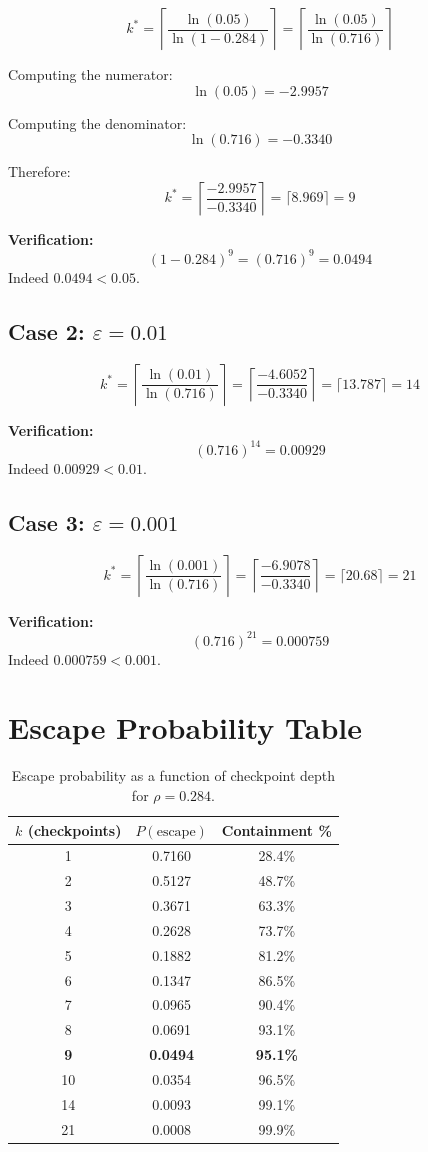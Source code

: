 \documentclass[12pt,a4paper]{article}
\begin{document}
\[
k^* = \left\lceil \frac{\ln(0.05)}{\ln(1 - 0.284)} \right\rceil = \left\lceil \frac{\ln(0.05)}{\ln(0.716)} \right\rceil
\]

Computing the numerator:
\[
\ln(0.05) = -2.9957
\]

Computing the denominator:
\[
\ln(0.716) = -0.3340
\]

Therefore:
\[
k^* = \left\lceil \frac{-2.9957}{-0.3340} \right\rceil = \lceil 8.969 \rceil = 9
\]

\textbf{Verification:}
\[
(1 - 0.284)^9 = (0.716)^9 = 0.0494
\]
Indeed $0.0494 < 0.05$. \checkmark

\subsection{Case 2: $\varepsilon = 0.01$}

\[
k^* = \left\lceil \frac{\ln(0.01)}{\ln(0.716)} \right\rceil = \left\lceil \frac{-4.6052}{-0.3340} \right\rceil = \lceil 13.787 \rceil = 14
\]

\textbf{Verification:}
\[
(0.716)^{14} = 0.00929
\]
Indeed $0.00929 < 0.01$. \checkmark

\subsection{Case 3: $\varepsilon = 0.001$}

\[
k^* = \left\lceil \frac{\ln(0.001)}{\ln(0.716)} \right\rceil = \left\lceil \frac{-6.9078}{-0.3340} \right\rceil = \lceil 20.68 \rceil = 21
\]

\textbf{Verification:}
\[
(0.716)^{21} = 0.000759
\]
Indeed $0.000759 < 0.001$. \checkmark

\section{Escape Probability Table}

\begin{table}[h]
\centering
\begin{tabular}{ccc}
\hline
$k$ (checkpoints) & $P(\text{escape})$ & Containment \% \\
\hline
1 & 0.7160 & 28.4\% \\
2 & 0.5127 & 48.7\% \\
3 & 0.3671 & 63.3\% \\
4 & 0.2628 & 73.7\% \\
5 & 0.1882 & 81.2\% \\
6 & 0.1347 & 86.5\% \\
7 & 0.0965 & 90.4\% \\
8 & 0.0691 & 93.1\% \\
\textbf{9} & \textbf{0.0494} & \textbf{95.1\%} \\
10 & 0.0354 & 96.5\% \\
14 & 0.0093 & 99.1\% \\
21 & 0.0008 & 99.9\% \\
\hline
\end{tabular}
\caption{Escape probability as a function of checkpoint depth for $\rho = 0.284$.}
\end{table}
\end{document}
